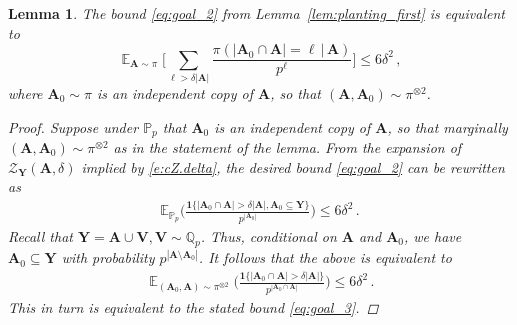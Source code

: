 \documentclass[11pt,reqno]{amsart}
\theoremstyle{plain}
\newtheorem{lemma}[theorem]{Lemma}
\theoremstyle{definition}
\theoremstyle{remark}
\newcommand{\E}{\mathbb{E}}
\newcommand{\QQ}{\mathbb{Q}}
\newcommand{\PP}{\mathbb{P}}
\newcommand{\EE}{\mathbb{E}}
\newcommand{\bA}{\mathbf{A}}
\newcommand{\bY}{\mathbf{Y}}
\newcommand{\bV}{\mathbf{V}}
\newcommand{\cZ}{\mathcal{Z}}
\begin{document}
\begin{lemma}\label{l:truncated.second.mmt}
The bound \eqref{eq:goal_2} from Lemma~\ref{lem:planting_first} is equivalent to
\begin{equation}\label{eq:goal_3} 
\mathop{\E}_{\bA\sim\pi} \bigg[
\sum_{\ell > \delta|\bA|} 
\frac{\pi(|\bA_0 \cap \bA|=\ell \,|\, \bA)}{p^\ell}
\bigg]
\leq 6\delta^2\,,
\end{equation}
where $\bA_0\sim\pi$ is an independent copy of $\bA$, so that $(\bA,\bA_0)\sim\pi^{\otimes2}$. 

\begin{proof}Suppose under $\PP_p$ that $\bA_0$ is an independent copy of $\bA$, so that marginally $(\bA,\bA_0)\sim\pi^{\otimes2}$ as in the statement of the lemma.
From the expansion of $\cZ_{\bY}(\bA,\delta)$ implied by \eqref{e:cZ.delta}, the desired bound \eqref{eq:goal_2} can be rewritten as
    \begin{align*}
    \EE_{\PP_p}\bigg(
    \frac{\mathbf{1}\{|\bA_0 \cap \bA| > \delta  |\bA|,
    \bA_0\subseteq \bY\}}{p^{|\bA_0|}} 
     \bigg)
    \le 6\delta^2\,. 
    \end{align*}
Recall that $\bY=\bA \cup \bV, \bV \sim \QQ_p$. Thus, conditional on $\bA$ and $\bA_0$, we have $\bA_0\subseteq \bY$ with probability $p^{|\bA\setminus \bA_0|}$. It follows that the above is equivalent to
\begin{align*}
\mathop{\EE}_{(\bA_0, \bA) \sim \pi^{\otimes 2}} \bigg(
\frac{\mathbf{1}\{ |\bA_0 \cap \bA| > \delta|\bA|\} }
	{p^{|\bA_0 \cap \bA|} }
	  \bigg)
\le 6\delta^2\,. 
\end{align*} This in turn is equivalent to the stated bound
\eqref{eq:goal_3}.
\end{proof}
\end{lemma}
\end{document}
